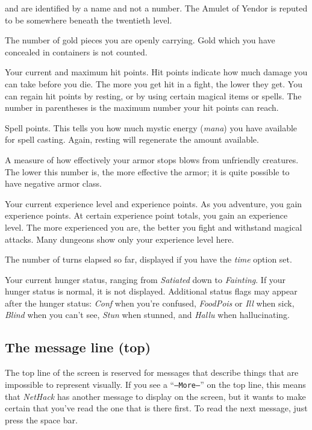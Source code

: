 and are identified by a name and not a number.  The Amulet of Yendor is
reputed to be somewhere beneath the twentieth level.
\item[\bb{Gold}]
The number of gold pieces you are openly carrying.  Gold which you have
concealed in containers is not counted.
\item[\bb{Hit Points}]
Your current and maximum hit points.  Hit points indicate how much
damage you can take before you die.  The more you get hit in a fight,
the lower they get.  You can regain hit points by resting, or by using
certain magical items or spells.  The number in parentheses is the maximum
number your hit points can reach.
\item[\bb{Power}]
Spell points.  This tells you how much mystic energy ({\it mana\/})
you have available for spell casting.  Again, resting will regenerate the
amount available.
\item[\bb{Armor Class}]
A measure of how effectively your armor stops blows from unfriendly
creatures.  The lower this number is, the more effective the armor; it
is quite possible to have negative armor class.
\item[\bb{Experience}]
Your current experience level and experience points.  As you
adventure, you gain experience points.  At certain experience point
totals, you gain an experience level.  The more experienced you are,
the better you fight and withstand magical attacks.  Many dungeons
show only your experience level here.
\item[\bb{Time}]
The number of turns elapsed so far, displayed if you have the
{\it time\/} option set.
\item[\bb{Hunger Status}]
Your current hunger status, ranging from %
{\it Satiated\/} down to {\it Fainting}.  If your hunger status is normal,
it is not displayed.
Additional status flags may appear after the hunger status:
{\it Conf\/} when you're confused, {\it FoodPois\/} or {\it Ill\/}
when sick, {\it Blind\/}
when you can't see, {\it Stun\/} when stunned, and {\it Hallu\/} when
hallucinating.
\elist

\subsection*{The message line (top)}

The top line of the screen is reserved for messages that describe
things that are impossible to represent visually.  If you see a
``{\tt --More--}'' on the top line, this means that {\it NetHack\/} has
another message to display on the screen, but it wants to make certain
that you've read the one that is there first.  To read the next message,
just press the space bar.

